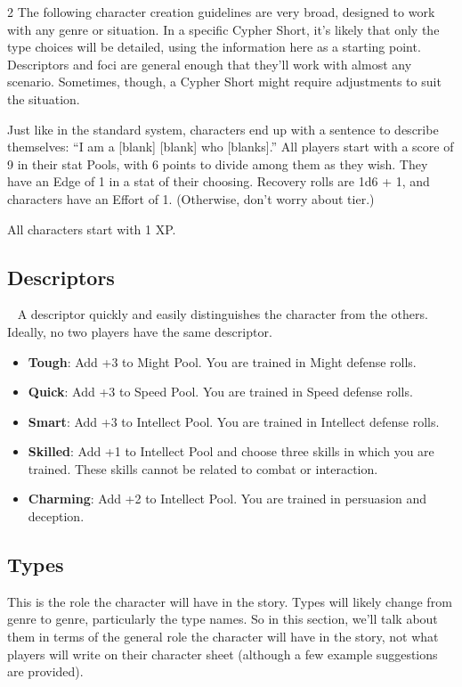 \begin{multicols}{2}
The following character creation guidelines are very broad, designed to work with any genre or situation. In a specific Cypher Short, it’s likely that only the type choices will be detailed, using the information here as a starting point. Descriptors and foci are general enough that they’ll work with almost any scenario. Sometimes, though, a Cypher Short might require adjustments to suit the situation.

Just like in the standard system, characters end up with a sentence to describe themselves: “I am a [blank] [blank] who [blanks].” All players start with a score of 9 in their stat Pools, with 6 points to divide among them as they wish. They have an Edge of 1 in a stat of their choosing. Recovery rolls are 1d6 + 1, and characters have an Effort of 1. (Otherwise, don’t worry about tier.)

All characters start with 1 XP.

\subsection{Descriptors}
 
A descriptor quickly and easily distinguishes the character from the others. Ideally, no two players have the same descriptor.

\begin{itemize}
\item \textbf{Tough}: Add +3 to Might Pool. You are trained in Might defense rolls.
\item \textbf{Quick}: Add +3 to Speed Pool. You are trained in Speed defense rolls.
\item \textbf{Smart}: Add +3 to Intellect Pool. You are trained in Intellect defense rolls.
\item \textbf{Skilled}: Add +1 to Intellect Pool and choose three skills in which you are trained. These skills cannot be related to combat or interaction.
\item \textbf{Charming}: Add +2 to Intellect Pool. You are trained in persuasion and deception.
\end{itemize}

\subsection{Types}

This is the role the character will have in the story. Types will likely change from genre to genre, particularly the type names. So in this section, we’ll talk about them in terms of the general role the character will have in the story, not what players will write on their character sheet (although a few example suggestions are provided).


\end{multicols}
